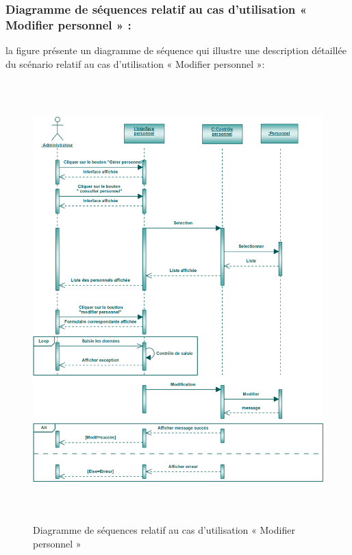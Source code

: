 \documentclass[12 pt ]{report}
\begin{document}
\subsubsection{Diagramme de séquences relatif au cas d’utilisation « Modifier personnel » :}
la figure   présente un diagramme de séquence qui illustre une description détaillée du scénario relatif au cas d’utilisation « Modifier personnel »: 
\begin{figure}[h]
 \begin{center}
\includegraphics[width= 18 cm ,height=  17cm]{sec_modif_per.PNG}
\caption{Diagramme de séquences relatif au cas d’utilisation « Modifier personnel  »}

\end{center}
\end{figure}
\newpage
\end{document}

